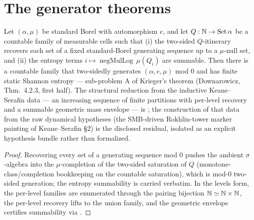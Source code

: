 \section{The generator theorems}

\begin{theorem}\label{exists_countable_twoSided_generator}
  \leanok
  Let \((\alpha,\mu)\) be standard Borel with automorphism \(e\), and let
  \(Q : \mathbb{N} \to \mathrm{Set}\,\alpha\) be a countable family of measurable cells such that
  (i) the two-sided \(Q\)-itinerary recovers each set of a fixed standard-Borel generating
  sequence up to a \(\mu\)-null set, and (ii) the entropy terms
  \(i \mapsto \operatorname{negMulLog}\,\mu(Q_i)\) are summable. Then there is a countable family
  that two-sidedly generates \((\alpha,e,\mu)\) mod \(0\) and has finite static Shannon entropy
  --- sub-problem A of Krieger's theorem (Downarowicz, Thm.~4.2.3, first half). The structural
  reduction from the inductive Keane--Serafin data --- an increasing sequence of finite partitions
  with per-level recovery and a summable geometric mass envelope --- is
  ; the construction of
  that data from the raw dynamical hypotheses (the SMB-driven Rokhlin-tower marker painting of
  Keane--Serafin \S2) is the disclosed residual, isolated as an explicit hypothesis bundle rather
  than formalized.
\end{theorem}
\begin{proof}\leanok
  Recovering every set of a generating sequence mod \(0\) pushes the ambient \(\sigma\)-algebra
  into the \(\mu\)-completion of the two-sided saturation of \(Q\) (monotone-class/completion
  bookkeeping on the countable saturation), which is mod-\(0\) two-sided generation; the entropy
  summability is carried verbatim. In the levels form, the per-level families are enumerated
  through the pairing bijection \(\mathbb{N} \simeq \mathbb{N}\times\mathbb{N}\), the per-level recovery lifts to the
  union family, and the geometric envelope certifies summability via
  .
\end{proof}

